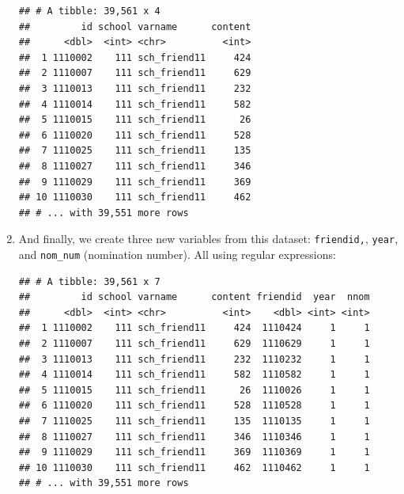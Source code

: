 \documentclass[]{book}
\newenvironment{Shaded}{\begin{snugshade}}{\end{snugshade}}
\newcommand{\DataTypeTok}[1]{\textcolor[rgb]{0.13,0.29,0.53}{#1}}
\newcommand{\DecValTok}[1]{\textcolor[rgb]{0.00,0.00,0.81}{#1}}
\newcommand{\KeywordTok}[1]{\textcolor[rgb]{0.13,0.29,0.53}{\textbf{#1}}}
\newcommand{\NormalTok}[1]{#1}
\newcommand{\OperatorTok}[1]{\textcolor[rgb]{0.81,0.36,0.00}{\textbf{#1}}}
\newcommand{\StringTok}[1]{\textcolor[rgb]{0.31,0.60,0.02}{#1}}
\begin{document}
\begin{enumerate}
\begin{verbatim}
## # A tibble: 39,561 x 4
##         id school varname      content
##      <dbl>  <int> <chr>          <int>
##  1 1110002    111 sch_friend11     424
##  2 1110007    111 sch_friend11     629
##  3 1110013    111 sch_friend11     232
##  4 1110014    111 sch_friend11     582
##  5 1110015    111 sch_friend11      26
##  6 1110020    111 sch_friend11     528
##  7 1110025    111 sch_friend11     135
##  8 1110027    111 sch_friend11     346
##  9 1110029    111 sch_friend11     369
## 10 1110030    111 sch_friend11     462
## # ... with 39,551 more rows
\end{verbatim}
\item
  And finally, we create three new variables from this dataset: \texttt{friendid,}, \texttt{year}, and \texttt{nom\_num} (nomination number). All using regular expressions:

\begin{Shaded}
\end{Shaded}

\begin{verbatim}
## # A tibble: 39,561 x 7
##         id school varname      content friendid  year  nnom
##      <dbl>  <int> <chr>          <int>    <dbl> <int> <int>
##  1 1110002    111 sch_friend11     424  1110424     1     1
##  2 1110007    111 sch_friend11     629  1110629     1     1
##  3 1110013    111 sch_friend11     232  1110232     1     1
##  4 1110014    111 sch_friend11     582  1110582     1     1
##  5 1110015    111 sch_friend11      26  1110026     1     1
##  6 1110020    111 sch_friend11     528  1110528     1     1
##  7 1110025    111 sch_friend11     135  1110135     1     1
##  8 1110027    111 sch_friend11     346  1110346     1     1
##  9 1110029    111 sch_friend11     369  1110369     1     1
## 10 1110030    111 sch_friend11     462  1110462     1     1
## # ... with 39,551 more rows
\end{verbatim}


\end{enumerate}
\end{document}
